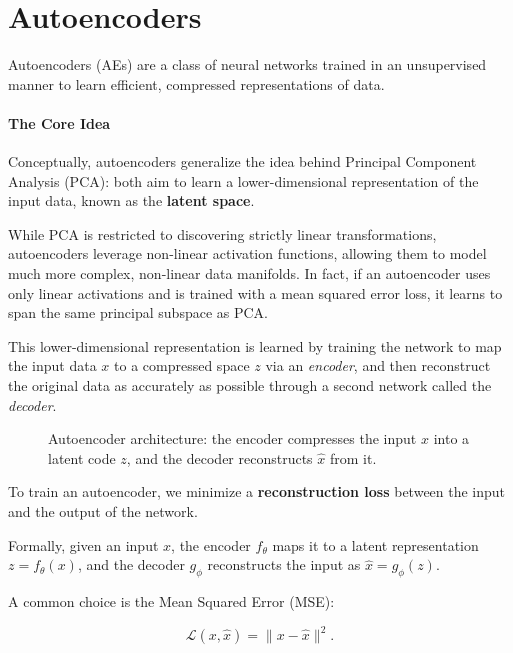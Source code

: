 \section{Autoencoders}
Autoencoders (AEs) are a class of neural networks trained in an unsupervised manner to learn efficient, compressed representations of data. 

\paragraph{The Core Idea}
Conceptually, autoencoders generalize the idea behind Principal Component Analysis (PCA): both aim to learn a lower-dimensional representation of the input data, known as the \textbf{latent space}.

While PCA is restricted to discovering strictly linear transformations, autoencoders leverage non-linear activation functions, allowing them to model much more complex, non-linear data manifolds. In fact, if an autoencoder uses only linear activations and is trained with a mean squared error loss, it learns to span the same principal subspace as PCA.

This lower-dimensional representation is learned by training the network to map the input data $x$ to a compressed space $z$ via an \textit{encoder}, and then reconstruct the original data as accurately as possible through a second network called the \textit{decoder}.

\begin{figure}[H]
    \centering
    \resizebox{0.6\textwidth}{!}{}
    \caption{Autoencoder architecture: the encoder compresses the input $x$ into a latent code $z$, and the decoder reconstructs $\hat{x}$ from it.}
    \label{fig:autoencoder-architecture}
\end{figure}

To train an autoencoder, we minimize a \textbf{reconstruction loss} between the input and the output of the network.

Formally, given an input $x$, the encoder $f_\theta$ maps it to a latent representation $z = f_\theta(x)$, and the decoder $g_\phi$ reconstructs the input as $\hat{x} = g_\phi(z)$.

A common choice is the Mean Squared Error (MSE):

\begin{equation}
    \mathcal{L}(x,\hat{x}) = \|x-\hat{x}\|^2.
\end{equation}

